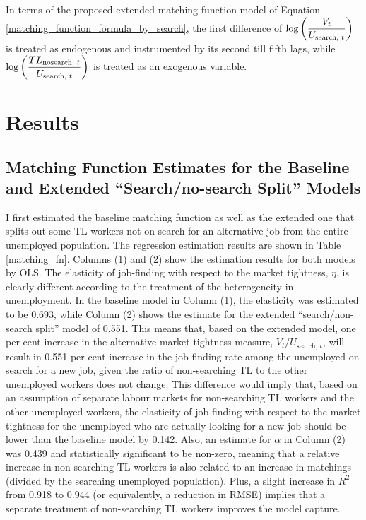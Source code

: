 \documentclass[a4paper, 11pt, tikz]{article}
\begin{document}
In terms of the proposed extended matching function model of Equation \ref{matching_function_formula_by_search}, the first difference of $\log\qty(\dfrac{V_t}{U_{\text{search, }t}})$ is treated as endogenous and instrumented by its second till fifth lags, while $\log\qty(\dfrac{TL_{\text{nosearch, }t}}{U_{\text{search, }t}})$ is treated as an exogenous variable.


\section{Results}

\subsection{Matching Function Estimates for the Baseline and Extended ``Search/no-search Split'' Models}
I first estimated the baseline matching function as well as the extended one that splits out some TL workers not on search for an alternative job from the entire unemployed population.
The regression estimation results are shown in Table \ref{matching_fn}.
Columns (1) and (2) show the estimation results for both models by OLS.
The elasticity of job-finding with respect to the market tightness, $\eta$, is clearly different according to the treatment of the heterogeneity in unemployment.
In the baseline model in Column (1), the elasticity was estimated to be 0.693, while Column (2) shows the estimate for the extended ``search/non-search split'' model of 0.551.
This means that, based on the extended model, one per cent increase in the alternative market tightness measure, $V_t / U_{\text{search, }t}$, will result in 0.551 per cent increase in the job-finding rate among the unemployed on search for a new job, given the ratio of non-searching TL to the other unemployed workers does not change.
This difference would imply that, based on an assumption of separate labour markets for non-searching TL workers and the other unemployed workers, the elasticity of job-finding with respect to the market tightness for the unemployed who are actually looking for a new job should be lower than the baseline model by 0.142.
Also, an estimate for $\alpha$ in Column (2) was 0.439 and statistically significant to be non-zero, meaning that a relative increase in non-searching TL workers is also related to an increase in matchings (divided by the searching unemployed population).
Plus, a slight increase in $R^2$ from 0.918 to 0.944 (or equivalently, a reduction in RMSE) implies that a separate treatment of non-searching TL workers improves the model capture.
\end{document}
